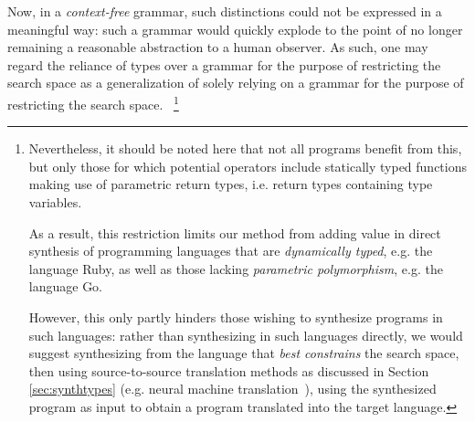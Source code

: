 \documentclass{article}
\begin{document}
Now, in a \emph{context-free} grammar,
such distinctions could not be expressed in a meaningful way:
such a grammar would quickly explode to the point of no longer remaining a reasonable abstraction to a human observer.
As such, one may regard the reliance of types over a grammar for the purpose of restricting the search space as a generalization of solely relying on a grammar for the purpose of restricting the search space.%
~\footnote{
    Nevertheless, it should be noted here that not all programs benefit from this,
    but only those for which potential operators include statically typed functions
    making use of parametric return types, i.e. return types containing type variables.

    As a result, this restriction limits our method from adding value in direct synthesis of programming languages that are \emph{dynamically typed},
    e.g. the language Ruby, as well as those lacking \emph{parametric polymorphism}, e.g. the language Go.

    However, this only partly hinders those wishing to synthesize programs in such languages:
    rather than synthesizing in such languages directly, we would suggest synthesizing from the language that \emph{best constrains} the search space,
    then using source-to-source translation methods as discussed in Section
    \ref{sec:synthtypes}
    (e.g. neural machine translation~\citep{kalchbrenner2013recurrent}),
    using the synthesized program as input to obtain a program translated into the target language.
}


\end{document}
